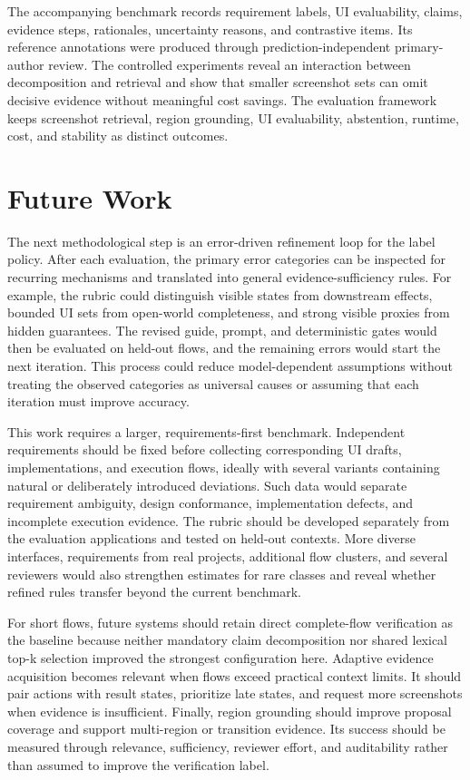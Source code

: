 The accompanying benchmark records requirement labels, UI evaluability,
claims, evidence steps, rationales, uncertainty reasons, and contrastive items.
Its reference annotations were produced through prediction-independent
primary-author review. The controlled experiments reveal an
interaction between decomposition and retrieval and show that smaller
screenshot sets can omit decisive evidence without meaningful cost savings.
The evaluation framework keeps screenshot retrieval, region grounding, UI
evaluability, abstention, runtime, cost, and stability as distinct outcomes.

\section{Future Work}\label{future-work}

The next methodological step is an error-driven refinement loop for the label
policy. After each evaluation, the primary error categories can be inspected
for recurring mechanisms and translated into general evidence-sufficiency
rules. For example, the rubric could distinguish visible states from downstream
effects, bounded UI sets from open-world completeness, and strong visible
proxies from hidden guarantees. The revised guide, prompt, and deterministic
gates would then be evaluated on held-out flows, and the remaining errors would
start the next iteration. This process could reduce model-dependent assumptions
without treating the observed categories as universal causes or assuming that
each iteration must improve accuracy.

This work requires a larger, requirements-first benchmark. Independent
requirements should be fixed before collecting corresponding UI drafts,
implementations, and execution flows, ideally with several variants containing
natural or deliberately introduced deviations. Such data would separate
requirement ambiguity, design conformance, implementation defects, and
incomplete execution evidence. The rubric should be developed separately from
the evaluation applications and tested on held-out contexts. More diverse
interfaces, requirements from real projects, additional flow clusters, and
several reviewers would also strengthen estimates for rare classes and reveal
whether refined rules transfer beyond the current benchmark.

For short flows, future systems should retain direct complete-flow verification
as the baseline because neither mandatory claim decomposition nor shared
lexical top-k selection improved the strongest configuration here. Adaptive evidence
acquisition becomes relevant when flows exceed practical context limits. It
should pair actions with result states, prioritize late states, and request more
screenshots when evidence is insufficient. Finally, region grounding should
improve proposal coverage and support multi-region or transition evidence. Its
success should be measured through relevance, sufficiency, reviewer effort, and
auditability rather than assumed to improve the verification label.
